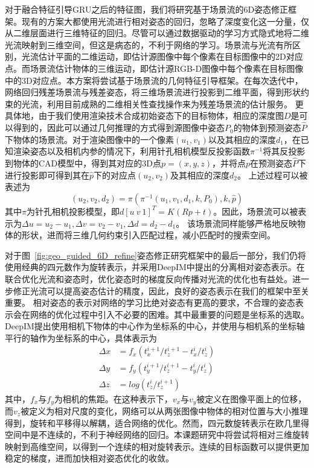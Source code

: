 \documentclass[12pt]{article}
\begin{document}
对于融合特征引导GRU之后的特征图，我们将研究基于场景流的6D姿态修正框架。现有的方案大都使用光流进行相对姿态的回归，忽略了深度变化这一分量，仅从二维层面进行三维特征的回归。尽管可以通过数据驱动的学习方式隐式地将二维光流映射到三维空间，但这是病态的，不利于网络的学习。场景流与光流有所区别，光流估计平面的二维运动，即估计源图像中每个像素在目标图像中的2D对应点。而场景流估计物体的三维运动，即估计源RGB-D图像中每个像素在目标图像中的3D对应点。本方案将尝试基于场景流的几何特征引导框架。在每次迭代中，网络回归残差场景流与残差姿态，将三维场景流进行投影到二维平面，得到形状约束的光流，利用目前成熟的二维相关性查找操作来为残差场景流的估计服务。
更具体地，由于我们使用渲染技术合成初始姿态下的目标物体，相应的深度图$D$是可以得到的，因此可以通过几何推理的方式得到源图像中姿态$P_0$的物体到预测姿态$\hat{P}$下物体的场景流。对于渲染图像中的一个像素$(u_1,v_1)$以及其相应的深度$d_1$，在已知渲染姿态以及相机内参的情况下，利用针孔相机模型反投影函数$\pi^{-1}$将其反投影到物体的CAD模型中，得到其对应的3D点$p=(x,y,z)$，并将点$p$在预测姿态$\hat{P}$下进行投影即可得到其在$\hat{p}$下的对应点$(u_2,v_2)$及其相应的深度$d_2$。
上述过程可以被表述为
\begin{equation}
    (u_2,v_2,d_2) = \pi(\pi^{-1}(u_1, v_1,d_1, k, P_0), k, \hat{p})
\end{equation}
其中$\pi$为针孔相机投影模型，即$d[u~v~1]^T=K(Rp+t)$。因此，场景流可以被表示为$\Delta u = u_2 - u_1, \Delta v = v_2 - v_1, \Delta d = d_2 - d_1$。
该场景流同样能够严格地反映物体的形状，进而将三维几何约束引入匹配过程，减小匹配时的搜索空间。

对于图~\ref{fig:geo_guided_6D_refine}姿态修正研究框架中的最后一部分，我们仍将使用经典的四元数作为旋转表示，并采用DeepIM\cite{li2018deepim}中提出的分离相对姿态表示。在联合优化光流和姿态时，优化姿态时的梯度反向传播对光流的优化也有益处。进一步修正光流可以提高姿态估计的精度，因此，良好的姿态表示在我们的框架中至关重要。
相对姿态的表示对网络的学习比绝对姿态有更高的要求，不合理的姿态表示会在网络的优化过程中引入不必要的困难。其中最重要的问题是坐标系的选取。DeepIM提出使用相机下物体的中心作为坐标系的中心，并使用与相机系的坐标轴平行的轴作为坐标系的中心，具体表示为
\begin{equation}
    \begin{aligned}
    \Delta x & = f_x(t_x^{i+1}/t_z^{i+1} - t_x^i/t_z^i)\\
    \Delta y & = f_y(t_y^{i+1}/t_z^{i+1} - t_y^i/t_z^i) \\
    \Delta z & = log(t_z^i/t_z^{i+1})
    \label{eq:relative_pose}
\end{aligned}
\end{equation}
其中，$f_x$与$f_y$为相机的焦距。在这种表示下，$v_x$与$v_y$被定义在图像平面上的位移，而$v_z$被定义为相对尺度的变化，网络可以从两张图像中物体的相对位置与大小推理得到，旋转和平移得以解耦，适合网络的优化。然而，四元数旋转表示在欧几里得空间中是不连续的，不利于神经网络的回归。本课题研究中将尝试将相对三维旋转映射到高维空间，以得到一个连续的相对旋转表示。连续的目标函数可以提供更加稳定的梯度，进而加快相对姿态优化的收敛。
\end{document}
